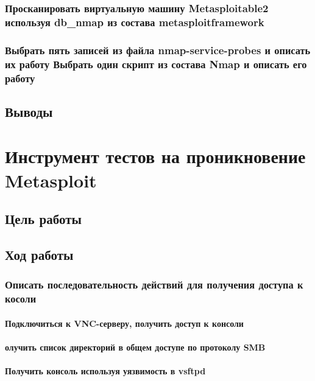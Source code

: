 \documentclass[a4paper, 12pt]{article}		%
\begin{document}
\subsubsection{Просканировать виртуальную машину Metasploitable2 используя db\_nmap из состава metasploit\-framework}

\subsubsection{Выбрать пять записей из файла nmap-service-probes и описать их работу Выбрать один скрипт из состава Nmap и описать его работу}

\subsection{Выводы}


\newpage
\section{Инструмент тестов на проникновение Metasploit}

\subsection{Цель работы}

\subsection{Ход работы}

\subsubsection{Описать последовательность действий для получения доступа к косоли}

\paragraph{Подключиться к VNC-серверу, получить доступ к консоли}

\paragraph{олучить список директорий в общем доступе по протоколу SMB}

\paragraph{Получить консоль используя уязвимость в vsftpd}
\end{document}
